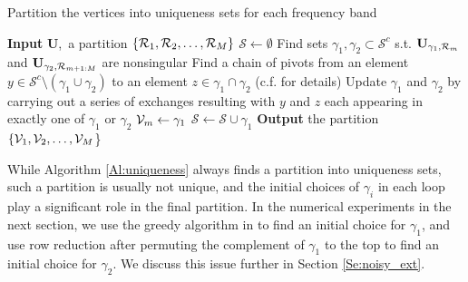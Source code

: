 \documentclass{article}
\begin{document}
\begin{algorithm} 
\caption{Partition the vertices into uniqueness sets for each frequency band}
\begin{algorithmic}
\State \textbf{Input} $\mathbf{U}$,~a partition $\{{{\cal R}_1,{\cal R}_2,\ldots,{\cal R}_M}\}$ %
\State $\mathcal{S} \gets \emptyset$
\State Find sets $\gamma_1, \gamma_2 \subset {\mathcal{S}}^c$ s.t. $\mathbf{U}_{\gamma_1,{\cal R}_m}$ and $\mathbf{U}_{\gamma_2,{\cal R}_{m+1:M}}$ are nonsingular
\While {$\gamma_1 \cap \gamma_2 \neq \emptyset$}
\State Find a chain of pivots from an element $y \in {\mathcal S}^c \setminus (\gamma_1 \cup \gamma_2)$
to an element $z \in \gamma_1 \cap \gamma_2$ (c.f. \cite{greene_magnanti} for details)
\State Update $\gamma_1$ and $\gamma_2$ by carrying out a series of exchanges resulting with $y$ and $z$ each appearing in exactly one of $\gamma_1$ or $\gamma_2$
\EndWhile
\State ${\mathcal{V}}_m \gets \gamma_1$%
\State $\mathcal{S} \gets \mathcal{S} \cup \gamma_1$ %
\EndFor
\State \textbf{Output} the partition $\{{\mathcal{V}}_1,{\mathcal{V}}_2,\ldots,{\mathcal{V}}_M$\}
\end{algorithmic}
\label{Al:uniqueness}
\end{algorithm}

\begin{remark}
While Algorithm \ref{Al:uniqueness} always finds a partition into uniqueness sets, such a partition is usually not unique, and the initial choices of $\gamma_i$ in each loop play a significant role in the final 
partition. In the numerical experiments in the next section, we use the greedy algorithm in \cite[Algorithm 1]{shomorony} to find an initial choice for $\gamma_1$, and use row reduction after permuting the complement of $\gamma_1$ to the top to find an initial choice for $\gamma_2$. We discuss this issue further in Section \ref{Se:noisy_ext}.
\end{remark}
\end{document}
